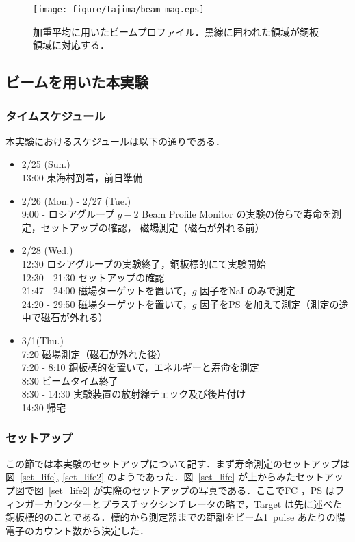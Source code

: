 \begin{figure}[H]
\centering
\texttt{[image: figure/tajima/beam\_mag.eps]}
\caption{加重平均に用いたビームプロファイル．黒線に囲われた領域が銅板領域に対応する．}
\label{beam_mag}
\end{figure}

\newpage

\subsection{ビームを用いた本実験}

\subsubsection{タイムスケジュール}
本実験におけるスケジュールは以下の通りである．
\begin{itemize}
\item 2/25 (Sun.)\\
13:00   東海村到着，前日準備
\item 2/26 (Mon.) - 2/27 (Tue.)\\
9:00 - ロシアグループ $g - 2$ Beam Profile Monitor の実験の傍らで寿命を測定，セットアップの確認， 磁場測定（磁石が外れる前）
\item 2/28 (Wed.)\\
12:30  \phantom{-} ロシアグループの実験終了，銅板標的にて実験開始\\ 
12:30 - 21:30 セットアップの確認\\
21:47 - 24:00 磁場ターゲットを置いて，$g$ 因子をNaI のみで測定\\
24:20 - 29:50 磁場ターゲットを置いて，$g$ 因子をPS を加えて測定（測定の途中で磁石が外れる）
\item 3/1(Thu.)\\
7:20 \phantom{-} 磁場測定（磁石が外れた後）\\
7:20 - 8:10 銅板標的を置いて，エネルギーと寿命を測定\\
8:30 \phantom{-} ビームタイム終了\\
8:30 - 14:30 実験装置の放射線チェック及び後片付け \\
14:30 帰宅
\end{itemize}

\subsubsection{セットアップ}
この節では本実験のセットアップについて記す．まず寿命測定のセットアップは図~\ref{set_life}, \ref{set_life2} のようであった．図~\ref{set_life} が上からみたセットアップ図で図~\ref{set_life2} が実際のセットアップの写真である．ここでFC ，PS はフィンガーカウンターとプラスチックシンチレータの略で，Target は先に述べた銅板標的のことである．標的から測定器までの距離をビーム1~pulse あたりの陽電子のカウント数から決定した．

